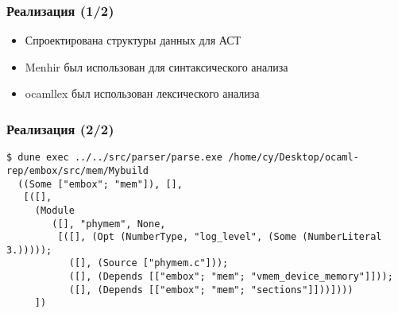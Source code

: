 \documentclass{beamer}
\begin{document}




\begin{frame}[fragile]
	\frametitle{Реализация (1/2)}
	\begin{itemize}
		\item Спроектирована структуры данных для АСТ
		\item Menhir был использован для синтаксического анализа
		\item ocamllex был использован лексического анализа
	\end{itemize}
\end{frame}

\begin{frame}[fragile]
	\frametitle{Реализация (2/2)}
	\begin{lstlisting}[language=caml, frame=single, breaklines, basicstyle=\footnotesize]
  $ dune exec ../../src/parser/parse.exe /home/cy/Desktop/ocaml-rep/embox/src/mem/Mybuild
  ((Some ["embox"; "mem"]), [],
   [([],
     (Module
        ([], "phymem", None,
         [([], (Opt (NumberType, "log_level", (Some (NumberLiteral 3.)))));
           ([], (Source ["phymem.c"]));
           ([], (Depends [["embox"; "mem"; "vmem_device_memory"]]));
           ([], (Depends [["embox"; "mem"; "sections"]]))])))
     ])
  \end{lstlisting}
\end{frame}
\end{document}
